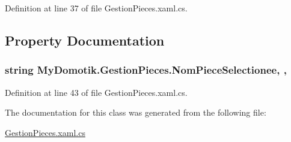 Definition at line 37 of file Gestion\+Pieces.\+xaml.\+cs.



\subsection{Property Documentation}
\subsubsection[{\texorpdfstring{Nom\+Piece\+Selectionee}{NomPieceSelectionee}}]{\setlength{\rightskip}{0pt plus 5cm}string My\+Domotik.\+Gestion\+Pieces.\+Nom\+Piece\+Selectionee\hspace{0.3cm}{\ttfamily [static]}, {\ttfamily [get]}, {\ttfamily [set]}}\hypertarget{class_my_domotik_1_1_gestion_pieces_a67a89cb8b8c4baa3b965c1e0cd991d0f}{}\label{class_my_domotik_1_1_gestion_pieces_a67a89cb8b8c4baa3b965c1e0cd991d0f}


Definition at line 43 of file Gestion\+Pieces.\+xaml.\+cs.



The documentation for this class was generated from the following file\+:\begin{DoxyCompactItemize}
\item 
\hyperlink{_gestion_pieces_8xaml_8cs}{Gestion\+Pieces.\+xaml.\+cs}\end{DoxyCompactItemize}
